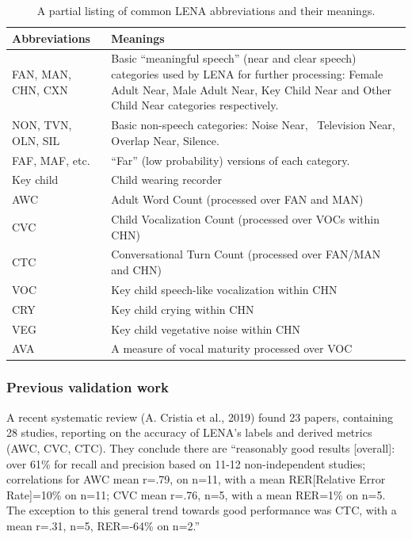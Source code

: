 \documentclass[english,floatsintext,man]{apa6}
\begin{document}
\begin{table}[t]

\caption{\label{tab:tab-abb}A partial listing of common LENA abbreviations and their meanings.}
\centering
\begin{tabular}{>{\raggedright\arraybackslash}p{10em}>{\raggedright\arraybackslash}p{30em}}
\toprule
Abbreviations & Meanings\\
\midrule
FAN, MAN, CHN, CXN & Basic “meaningful speech” (near and clear speech) categories used by LENA for further processing: Female Adult Near, Male Adult Near, Key Child Near and Other Child Near categories respectively.\\
NON, TVN, OLN, SIL & Basic non-speech categories: Noise Near,  Television Near, Overlap Near, Silence.\\
FAF, MAF, etc. & “Far” (low probability) versions of each category.\\
Key child & Child wearing recorder\\
AWC & Adult Word Count (processed over FAN and MAN)\\
\addlinespace
CVC & Child Vocalization Count (processed over VOCs within CHN)\\
CTC & Conversational Turn Count (processed over FAN/MAN and CHN)\\
VOC & Key child speech-like vocalization within CHN\\
CRY & Key child crying within CHN\\
VEG & Key child vegetative noise within CHN\\
\addlinespace
AVA & A measure of vocal maturity processed over VOC\\
\bottomrule
\end{tabular}
\end{table}

\subsubsection{Previous validation work}\label{previous-validation-work}

A recent systematic review (A. Cristia et al., 2019) found 23 papers,
containing 28 studies, reporting on the accuracy of LENA's labels and
derived metrics (AWC, CVC, CTC). They conclude there are
\enquote{reasonably good results {[}overall{]}: over 61\% for recall and
precision based on 11-12 non-independent studies; correlations for AWC
mean r=.79, on n=11, with a mean RER{[}Relative Error Rate{]}=10\% on
n=11; CVC mean r=.76, n=5, with a mean RER=1\% on n=5. The exception to
this general trend towards good performance was CTC, with a mean r=.31,
n=5, RER=-64\% on n=2.}
\end{document}
